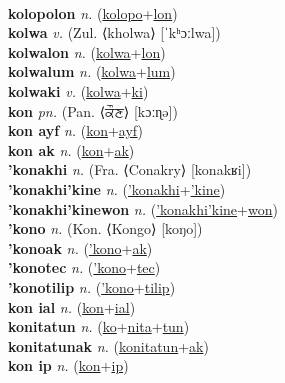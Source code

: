 \label{kolopoles} \\
\textbf{kolopolon} \textit{n.} (\hyperref[kolopo]{kolopo}+\hyperref[lon]{lon})
 \label{kolopolon} \\
\textbf{kolwa} \textit{v.} (Zul. ⟨kholwa⟩ [ˈkʰɔːlwa])
 \label{kolwa} \\
\textbf{kolwalon} \textit{n.} (\hyperref[kolwa]{kolwa}+\hyperref[lon]{lon})
 \label{kolwalon} \\
\textbf{kolwalum} \textit{n.} (\hyperref[kolwa]{kolwa}+\hyperref[lum]{lum})
 \label{kolwalum} \\
\textbf{kolwaki} \textit{v.} (\hyperref[kolwa]{kolwa}+\hyperref[ki]{ki})
 \label{kolwaki} \\
\textbf{kon} \textit{pn.} (Pan. ⟨ਕੌਣ⟩ [kɔːɳə])
 \label{kon} \\
\textbf{kon ayf} \textit{n.} (\hyperref[kon]{kon}+\hyperref[ayf]{ayf})
 \label{kon ayf} \\
\textbf{kon ak} \textit{n.} (\hyperref[kon]{kon}+\hyperref[ak]{ak})
 \label{kon ak} \\
\textbf{'konakhi} \textit{n.} (Fra. ⟨Conakry⟩ [konakʁi])
 \label{'konakhi} \\
\textbf{'konakhi'kine} \textit{n.} (\hyperref['konakhi]{'konakhi}+\hyperref['kine]{'kine})
 \label{'konakhi'kine} \\
\textbf{'konakhi'kinewon} \textit{n.} (\hyperref['konakhi'kine]{'konakhi'kine}+\hyperref[won]{won})
 \label{'konakhi'kinewon} \\
\textbf{'kono} \textit{n.} (Kon. ⟨Kongo⟩ [koŋo])
 \label{'kono} \\
\textbf{'konoak} \textit{n.} (\hyperref['kono]{'kono}+\hyperref[ak]{ak})
 \label{'konoak} \\
\textbf{'konotec} \textit{n.} (\hyperref['kono]{'kono}+\hyperref[tec]{tec})
 \label{'konotec} \\
\textbf{'konotilip} \textit{n.} (\hyperref['kono]{'kono}+\hyperref[tilip]{tilip})
 \label{'konotilip} \\
\textbf{kon ial} \textit{n.} (\hyperref[kon]{kon}+\hyperref[ial]{ial})
 \label{kon ial} \\
\textbf{konitatun} \textit{n.} (\hyperref[ko]{ko}+\hyperref[nita]{nita}+\hyperref[tun]{tun})
 \label{konitatun} \\
\textbf{konitatunak} \textit{n.} (\hyperref[konitatun]{konitatun}+\hyperref[ak]{ak})
 \label{konitatunak} \\
\textbf{kon ip} \textit{n.} (\hyperref[kon]{kon}+\hyperref[ip]{ip})
 \label{kon ip} \\
